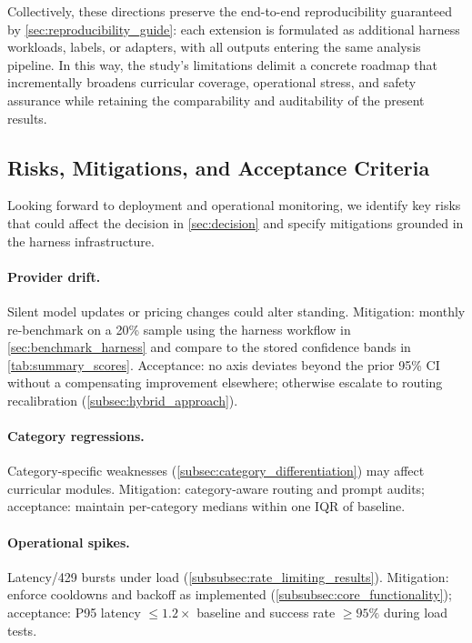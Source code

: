 Collectively, these directions preserve the end-to-end reproducibility guaranteed by \cref{sec:reproducibility_guide}: each extension is formulated as additional harness workloads, labels, or adapters, with all outputs entering the same analysis pipeline. In this way, the study's limitations delimit a concrete roadmap that incrementally broadens curricular coverage, operational stress, and safety assurance while retaining the comparability and auditability of the present results.

\subsection{Risks, Mitigations, and Acceptance Criteria}
\label{subsec:risks_mitigations}

Looking forward to deployment and operational monitoring, we identify key risks that could affect the decision in \cref{sec:decision} and specify mitigations grounded in the harness infrastructure.

\paragraph{Provider drift.} Silent model updates or pricing changes could alter standing. Mitigation: monthly re-benchmark on a 20\% sample using the harness workflow in \cref{sec:benchmark_harness} and compare to the stored confidence bands in \cref{tab:summary_scores}. Acceptance: no axis deviates beyond the prior 95\% CI without a compensating improvement elsewhere; otherwise escalate to routing recalibration (\cref{subsec:hybrid_approach}).

\paragraph{Category regressions.} Category-specific weaknesses (\cref{subsec:category_differentiation}) may affect curricular modules. Mitigation: category-aware routing and prompt audits; acceptance: maintain per-category medians within one IQR of baseline.

\paragraph{Operational spikes.} Latency/429 bursts under load (\cref{subsubsec:rate_limiting_results}). Mitigation: enforce cooldowns and backoff as implemented (\cref{subsubsec:core_functionality}); acceptance: P95 latency $\leq 1.2\times$ baseline and success rate $\geq 95\%$ during load tests.

